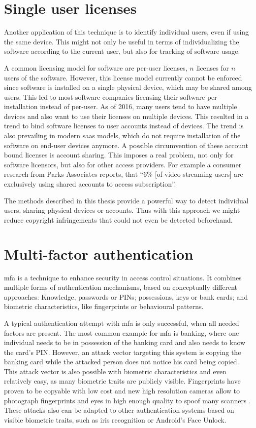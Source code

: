 \section{Single user licenses}
Another application of this technique is to identify individual users, even if using the same device. This might not only be useful in terms of individualizing the software according to the current user, but also for tracking of software usage.

A common licensing model for software are per-user licenses, \ie $n$ licenses for $n$ users of the software. However, this license model currently cannot be enforced since software is installed on a single physical device, which may be shared among users. This led to most software companies licensing their software per-installation instead of per-user.
As of 2016, many users tend to have multiple devices and also want to use their licenses on multiple devices. This resulted in a trend to bind software licenses to user accounts instead of devices. The trend is also prevailing in modern \gls{saas} models, which do not require installation of the software on end-user devices anymore.
A possible circumvention of these account bound licenses is account sharing. This imposes a real problem, not only for software licensors, but also for other access providers. For example a consumer research from Parks Associates \cite{accountsharing} reports, that ``6\% [of video streaming users] are exclusively using shared accounts to access subscription''. 

The methods described in this thesis provide a powerful way to detect individual users, sharing physical devices or accounts. Thus with this approach we might reduce copyright infringements that could not even be detected beforehand.

\section{Multi-factor authentication}
\gls{mfa} is a technique to enhance security in access control situations. It combines multiple forms of authentication mechanisms, based on conceptually different approaches: Knowledge, \eg passwords or PINs; possessions, \eg keys or bank cards; and biometric characteristics, like fingerprints or behavioural patterns.

A typical authentication attempt with \gls{mfa} is only successful, when all needed factors are present. The most common example for \gls{mfa} is banking, where one individual needs to be in possession of the banking card and also needs to know the card's PIN. However, an attack vector targeting this system is copying the banking card while the attacked person does not notice his card being copied. This attack vector is also possible with biometric characteristics and even relatively easy, as many biometric traits are publicly visible. Fingerprints have proven to be copyable with low cost \cite{starbug2008bastel} and new high resolution cameras allow to photograph fingerprints and eyes in high enough quality to spoof many scanners \cite{fiebig2014security}. These attacks also can be adapted to other authentication systems based on visible biometric traits, such as iris recognition or Android's Face Unlock.

